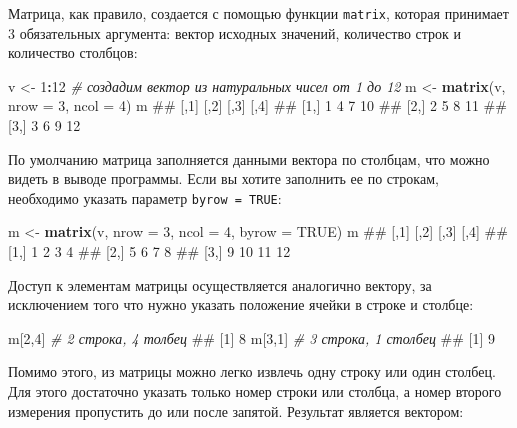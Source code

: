 \documentclass[]{book}
\newenvironment{Shaded}{\begin{snugshade}}{\end{snugshade}}
\newcommand{\KeywordTok}[1]{\textcolor[rgb]{0.13,0.29,0.53}{\textbf{#1}}}
\newcommand{\DataTypeTok}[1]{\textcolor[rgb]{0.13,0.29,0.53}{#1}}
\newcommand{\DecValTok}[1]{\textcolor[rgb]{0.00,0.00,0.81}{#1}}
\newcommand{\StringTok}[1]{\textcolor[rgb]{0.31,0.60,0.02}{#1}}
\newcommand{\CommentTok}[1]{\textcolor[rgb]{0.56,0.35,0.01}{\textit{#1}}}
\newcommand{\OtherTok}[1]{\textcolor[rgb]{0.56,0.35,0.01}{#1}}
\newcommand{\OperatorTok}[1]{\textcolor[rgb]{0.81,0.36,0.00}{\textbf{#1}}}
\newcommand{\NormalTok}[1]{#1}
\begin{document}
Матрица, как правило, создается с помощью функции \texttt{matrix},
которая принимает 3 обязательных аргумента: вектор исходных значений,
количество строк и количество столбцов:

\begin{Shaded}
\begin{Highlighting}[]
\NormalTok{v <-}\StringTok{ }\DecValTok{1}\OperatorTok{:}\DecValTok{12}  \CommentTok{# создадим вектор из натуральных чисел от 1 до 12}
\NormalTok{m <-}\StringTok{ }\KeywordTok{matrix}\NormalTok{(v, }\DataTypeTok{nrow =} \DecValTok{3}\NormalTok{, }\DataTypeTok{ncol =} \DecValTok{4}\NormalTok{)}
\NormalTok{m}
\NormalTok{##      [,1] [,2] [,3] [,4]}
\NormalTok{## [1,]    1    4    7   10}
\NormalTok{## [2,]    2    5    8   11}
\NormalTok{## [3,]    3    6    9   12}
\end{Highlighting}
\end{Shaded}

По умолчанию матрица заполняется данными вектора по столбцам, что можно
видеть в выводе программы. Если вы хотите заполнить ее по строкам,
необходимо указать параметр \texttt{byrow\ =\ TRUE}:

\begin{Shaded}
\begin{Highlighting}[]
\NormalTok{m <-}\StringTok{ }\KeywordTok{matrix}\NormalTok{(v, }\DataTypeTok{nrow =} \DecValTok{3}\NormalTok{, }\DataTypeTok{ncol =} \DecValTok{4}\NormalTok{, }\DataTypeTok{byrow =} \OtherTok{TRUE}\NormalTok{)}
\NormalTok{m}
\NormalTok{##      [,1] [,2] [,3] [,4]}
\NormalTok{## [1,]    1    2    3    4}
\NormalTok{## [2,]    5    6    7    8}
\NormalTok{## [3,]    9   10   11   12}
\end{Highlighting}
\end{Shaded}

Доступ к элементам матрицы осуществляется аналогично вектору, за
исключением того что нужно указать положение ячейки в строке и столбце:

\begin{Shaded}
\begin{Highlighting}[]
\NormalTok{m[}\DecValTok{2}\NormalTok{,}\DecValTok{4}\NormalTok{]  }\CommentTok{# 2 строка, 4 толбец}
\NormalTok{## [1] 8}
\NormalTok{m[}\DecValTok{3}\NormalTok{,}\DecValTok{1}\NormalTok{]  }\CommentTok{# 3 строка, 1 столбец}
\NormalTok{## [1] 9}
\end{Highlighting}
\end{Shaded}

Помимо этого, из матрицы можно легко извлечь одну строку или один
столбец. Для этого достаточно указать только номер строки или столбца, а
номер второго измерения пропустить до или после запятой. Результат
является вектором:
\end{document}
